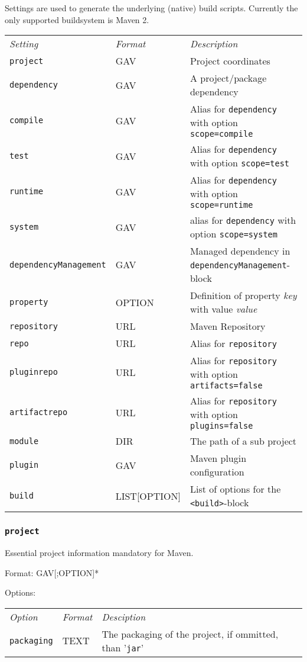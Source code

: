 \documentclass[a4paper,12pt,english,oneside,halfparskip]{scrartcl}
\newcommand{\code}[1]{\texttt{#1}}
\begin{document}
Settings are used to generate the underlying (native) build scripts. Currently the only supported buildsystem is Maven 2.

{\small
\begin{tabular}{llp{.50\linewidth}}
\emph{Setting} & \emph{Format} & \emph{Description} \\
\code{project} & GAV & Project coordinates \\
\code{dependency} & GAV & A project/package dependency \\
\code{compile} & GAV & Alias for \code{dependency} with option \code{scope=compile} \\
\code{test} & GAV & Alias for \code{dependency} with option \code{scope=test} \\
\code{runtime} & GAV & Alias for \code{dependency} with option \code{scope=runtime} \\
\code{system} & GAV & alias for \code{dependency} with option \code{scope=system} \\
\code{\small dependencyManagement} & GAV & Managed dependency in \code{dependencyManagement}-block \\
\code{property} & OPTION & Definition of property \emph{key} with value \emph{value} \\
\code{repository} & URL & Maven Repository \\
\code{repo} & URL & Alias for \code{repository} \\
\code{pluginrepo} & URL & Alias for \code{repository} with option \code{artifacts=false} \\
\code{artifactrepo} & URL & Alias for \code{repository} with option \code{plugins=false} \\
\code{module} & DIR & The path of a sub project \\
\code{plugin} & GAV & Maven plugin configuration \\
\code{build} & LIST[OPTION] & List of options for the \code{<build>}-block
\end{tabular}
}


\subsubsection{\code{project}}

Essential project information mandatory for Maven.

Format: GAV[;OPTION]*

Options:

\begin{tabular}{lll}
\emph{Option} & \emph{Format} & \emph{Desciption} \\
\code{packaging} & TEXT & The packaging of the project, if ommitted, than '\code{jar}'
\end{tabular}
\end{document}
